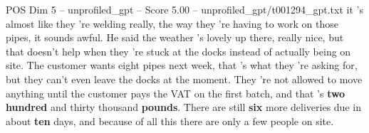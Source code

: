 \begin{textsample}{POS Dim 5 – unprofiled\_gpt – Score 5.00 – unprofiled\_gpt/t001294\_gpt.txt}  \label{ex:f5_pos_034}
it ’s almost like they ’re welding really, the way they ’re having to work on those pipes, it sounds awful.
He said the weather ’s lovely up there, really nice, but that doesn't help when they ’re stuck at the docks instead of actually being on site.
The customer wants eight pipes next week, that ’s what they ’re asking for, but they can't even leave the docks at the moment.
They ’re not allowed to move anything until the customer pays the VAT on the first batch, and that ’s \textbf{two} \textbf{hundred} and thirty thousand \textbf{pounds}.
There are still \textbf{six} more deliveries due in about \textbf{ten} days, and because of all this there are only a few people on site.

\end{textsample}
